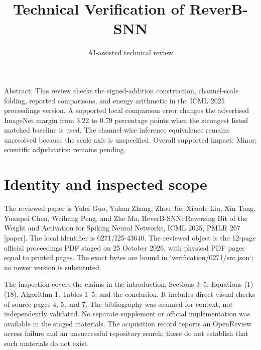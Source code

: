 \documentclass[10pt]{article}
\title{Technical Verification of ReverB-SNN}
\author{AI-assisted technical review}
\date{}
\begin{document}
\maketitle
Abstract: This review checks the signed-addition construction, channel-scale folding, reported comparisons, and energy arithmetic in the ICML 2025 proceedings version. A supported local comparison error changes the advertised ImageNet margin from 3.22 to 0.79 percentage points when the strongest listed matched baseline is used. The channel-wise inference equivalence remains unresolved because the scale axis is unspecified. Overall supported impact: Minor; scientific adjudication remains pending.\par
\section*{Identity and inspected scope}
The reviewed paper is Yufei Guo, Yuhan Zhang, Zhou Jie, Xiaode Liu, Xin Tong, Yuanpei Chen, Weihang Peng, and Zhe Ma, ReverB-SNN: Reversing Bit of the Weight and Activation for Spiking Neural Networks, ICML 2025, PMLR 267 [paper]. The local identifier is 0271/I25-43640. The reviewed object is the 12-page official proceedings PDF staged on 25 October 2026, with physical PDF pages equal to printed pages. The exact bytes are bound in `verification/0271/src.json`; no newer version is substituted.\par
The inspection covers the claims in the introduction, Sections 3–5, Equations (1)–(18), Algorithm 1, Tables 1–5, and the conclusion. It includes direct visual checks of source pages 4, 5, and 7. The bibliography was scanned for context, not independently validated. No separate supplement or official implementation was available in the staged materials. The acquisition record reports an OpenReview access failure and an unsuccessful repository search; these do not establish that such materials do not exist.\par
\end{document}
